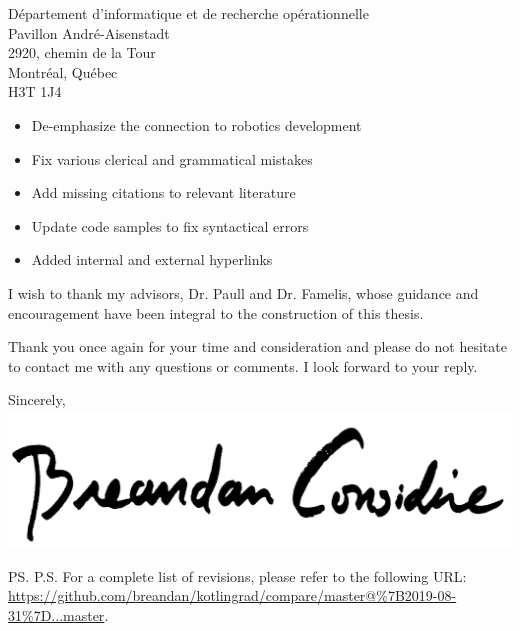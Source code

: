 \documentclass{letter}
\begin{document}
\begin{letter}{D\'epartement d'informatique et de recherche op\'erationnelle \\ Pavillon Andr\'e-Aisenstadt \\ 2920, chemin de la Tour \\ Montr\'eal, Qu\'ebec \\ H3T 1J4}
\begin{itemize}
\begin{itemize}
                    \item De-emphasize the connection to robotics development
                    \item Fix various clerical and grammatical mistakes
                    \item Add missing citations to relevant literature
                    \item Update code samples to fix syntactical errors
                    \item Added internal and external hyperlinks
                \end{itemize}
        \end{itemize}

        I wish to thank my advisors, Dr. Paull and Dr. Famelis, whose guidance and encouragement have been integral to the construction of this thesis.

        Thank you once again for your time and consideration and please do not hesitate to contact me with any questions or comments. I look forward to your reply.

        \closing{Sincerely,\\
            \includegraphics[scale=0.06]{signature.png}\\
        }
        \ps{P.S. For a complete list of revisions, please refer to the following URL: \\
        {\footnotesize\url{https://github.com/breandan/kotlingrad/compare/master@\%7B2019-08-31\%7D...master}}.}
    \end{letter}
\end{document}
